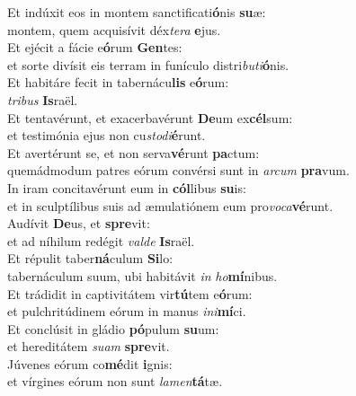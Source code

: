 \oddverse Et indúxit eos in montem sanctificati\textbf{ó}nis \textbf{su}æ:~\*\\
\oddverse montem, quem acquisívit déx\textit{te}\textit{ra} \textbf{e}jus.\\
\evenverse Et ejécit a fácie e\textbf{ó}rum \textbf{Gen}tes:~\*\\
\evenverse et sorte divísit eis terram in funículo distri\textit{bu}\textit{ti}\textbf{ó}nis.\\
\oddverse Et habitáre fecit in tabernácu\textbf{lis} e\textbf{ó}rum:~\*\\
\oddverse \textit{tri}\textit{bus} \textbf{Is}raël.\\
\evenverse Et tentavérunt, et exacerbavérunt \textbf{De}um ex\textbf{cél}sum:~\*\\
\evenverse et testimónia ejus non cu\textit{sto}\textit{di}\textbf{é}runt.\\
\oddverse Et avertérunt se, et non serva\textbf{vé}runt \textbf{pa}ctum:~\*\\
\oddverse quemádmodum patres eórum convérsi sunt in \textit{ar}\textit{cum} \textbf{pra}vum.\\
\evenverse In iram concitavérunt eum in \textbf{cól}libus \textbf{su}is:~\*\\
\evenverse et in sculptílibus suis ad æmulatiónem eum pro\textit{vo}\textit{ca}\textbf{vé}runt.\\
\oddverse Audívit \textbf{De}us, et \textbf{spre}vit:~\*\\
\oddverse et ad níhilum redégit \textit{val}\textit{de} \textbf{Is}raël.\\
\evenverse Et répulit taber\textbf{ná}culum \textbf{Si}lo:~\*\\
\evenverse tabernáculum suum, ubi habitávit \textit{in} \textit{ho}\textbf{mí}nibus.\\
\oddverse Et trádidit in captivitátem vir\textbf{tú}tem e\textbf{ó}rum:~\*\\
\oddverse et pulchritúdinem eórum in manus \textit{i}\textit{ni}\textbf{mí}ci.\\
\evenverse Et conclúsit in gládio \textbf{pó}pulum \textbf{su}um:~\*\\
\evenverse et hereditátem \textit{su}\textit{am} \textbf{spre}vit.\\
\oddverse Júvenes eórum co\textbf{mé}dit \textbf{i}gnis:~\*\\
\oddverse et vírgines eórum non sunt \textit{la}\textit{men}\textbf{tá}tæ.\\
